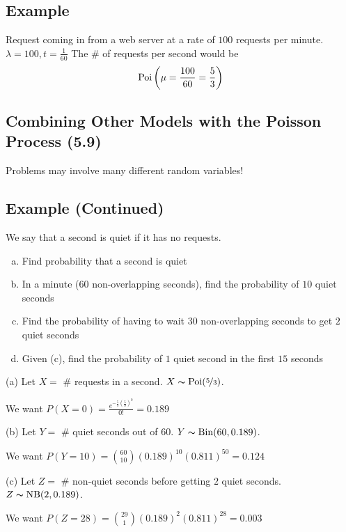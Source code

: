 \subsection{Example}
Request coming in from a web server at a rate of $ 100 $ requests per minute.
$ \lambda = 100, t=\frac{1}{60} $
The \# of requests per second would be
\[ \operatorname{Poi}\left(\mu=\frac{100}{60}=\frac{5}{3}\right) \]

\subsection{Combining Other Models with the Poisson Process (5.9)}
Problems may involve many different random variables!

\subsection{Example (Continued)}
We say that a second is quiet if it has no requests.
\begin{enumerate}[(a)]
    \item Find probability that a second is quiet
    \item In a minute ($60$ non-overlapping seconds), find the probability of $10$ quiet seconds
    \item Find the probability of having to wait $ 30 $ non-overlapping seconds to get $ 2 $ quiet seconds
    \item Given (c), find the probability of $ 1 $ quiet second in the first $ 15 $ seconds
\end{enumerate}
(a) Let $ X= $ \# requests in a second. $ X \thicksim \operatorname{Poi}(\nicefrac{5}{3}) $.

We want $ P(X=0)=\frac{e^{-\frac{5}{3}(\frac{5}{3})^0}}{0!}=0.189 $


(b) Let $ Y= $ \# quiet seconds out of 60. $ Y \thicksim \operatorname{Bin}(60,0.189) $.

We want $ P(Y=10)=\binom{60}{10}(0.189)^{10}(0.811)^{50}=0.124 $

(c) Let $ Z= $ \# non-quiet seconds before getting $ 2 $ quiet seconds. 
$ Z \thicksim \operatorname{NB}(2,0.189) $.

We want $ P(Z=28)=\binom{29}{1}(0.189)^2(0.811)^{28}=0.003 $

